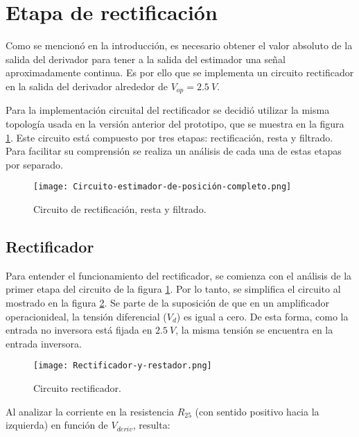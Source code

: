 \section{Etapa de rectificación}

Como se mencionó en la introducción, es necesario obtener el valor absoluto de la salida del derivador para tener a la salida del estimador una señal aproximadamente continua. Es por ello que se implementa un circuito rectificador en la salida del derivador alrededor de $V_{op}=2.5\:V$.

Para la implementación circuital del rectificador se decidió utilizar la misma topología usada en la versión anterior del prototipo, que se muestra en la figura \ref{fig:img_Circuito_estimador_de_posición_completo}. Este circuito está compuesto por tres etapas: rectificación, resta y filtrado. Para facilitar su comprensión se realiza un análisis de cada una de estas etapas por separado.

\begin{figure}[H]
	\centering
	\texttt{[image: Circuito-estimador-de-posición-completo.png]}
	\caption{Circuito de rectificación, resta y filtrado.}
	\label{fig:img_Circuito_estimador_de_posición_completo}
\end{figure}

\subsection{Rectificador}

Para entender el funcionamiento del rectificador, se comienza con el análisis de la primer etapa del circuito de la figura \ref{fig:img_Circuito_estimador_de_posición_completo}. Por lo tanto, se simplifica el circuito al mostrado en la figura \ref{fig:img_Rectificador_y_restador}. Se parte de la suposición de que en un amplificador operacionideal, la tensión diferencial ($V_d$) es igual a cero. De esta forma, como la entrada no inversora está fijada en $2.5\:V$, la misma tensión se encuentra en la entrada inversora.


\begin{figure}[H]
	\centering
	\texttt{[image: Rectificador-y-restador.png]}
	\caption{Circuito rectificador.}
	\label{fig:img_Rectificador_y_restador}
\end{figure}

Al analizar la corriente en la resistencia $R_{25}$ (con sentido positivo hacia la izquierda) en función de $V_{deriv}$, resulta:

